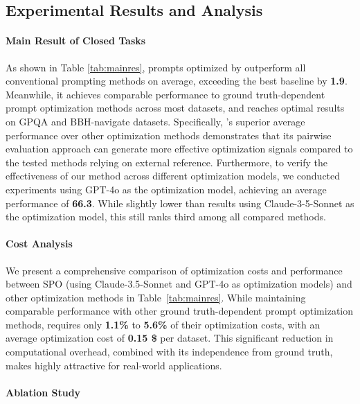 \subsection{Experimental Results and Analysis}

\paragraph{Main Result of Closed Tasks}


As shown in Table \ref{tab:mainres}, prompts optimized by \ours outperform all conventional prompting methods on average, exceeding the best baseline by \textbf{1.9}. Meanwhile, it achieves comparable performance to ground truth-dependent prompt optimization methods across most datasets, and reaches optimal results on GPQA and BBH-navigate datasets. Specifically, \ours's superior average performance over other optimization methods demonstrates that its pairwise evaluation approach can generate more effective optimization signals compared to the tested methods relying on external reference. Furthermore, to verify the effectiveness of our method across different optimization models, we conducted experiments using GPT-4o as the optimization model, achieving an average performance of \textbf{66.3}. While slightly lower than results using Claude-3-5-Sonnet as the optimization model, this still ranks third among all compared methods.

\paragraph{Cost Analysis}


We present a comprehensive comparison of optimization costs and performance between SPO (using Claude-3.5-Sonnet and GPT-4o as optimization models) and other optimization methods in Table~\ref{tab:mainres}. While maintaining comparable performance with other ground truth-dependent prompt optimization methods, \ours requires only \textbf{1.1\%} to \textbf{5.6\%} of their optimization costs, with an average optimization cost of \textbf{0.15 \$} per dataset. This significant reduction in computational overhead, combined with its independence from ground truth, makes \ours highly attractive for real-world applications.


\paragraph{Ablation Study}

